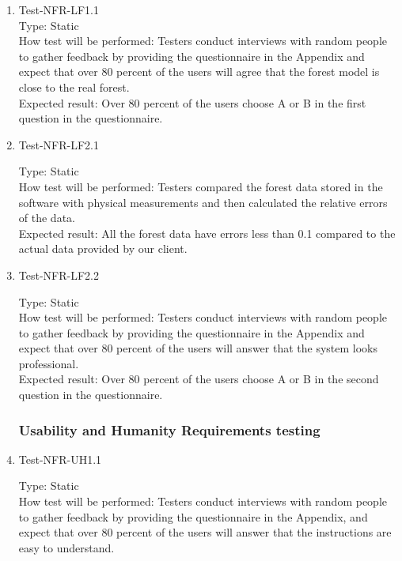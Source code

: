 \documentclass[12pt, titlepage]{article}
\begin{document}
\begin{enumerate}

\item{Test-NFR-LF1.1\\}
Type: Static\\

How test will be performed: Testers conduct interviews with random people to gather feedback by providing the questionnaire in the Appendix and expect that over 80 percent of the users will agree that the forest model is close to the real forest.\\

Expected result: Over 80 percent of the users choose A or B in the first question in the questionnaire.

\item{Test-NFR-LF2.1\\}

Type: Static\\

How test will be performed: Testers compared the forest data stored in the software with physical measurements and then calculated the relative errors of the data.\\

Expected result: All the forest data have errors less than 0.1 compared to the actual data provided by our client. 

\item{Test-NFR-LF2.2\\}

Type: Static\\

How test will be performed: Testers conduct interviews with random people to gather feedback by providing the questionnaire in the Appendix and expect that over 80 percent of the users will answer that the system looks professional.\\

Expected result: Over 80 percent of the users choose A or B in the second question in the questionnaire.

\subsubsection{Usability and Humanity Requirements testing}
\item{Test-NFR-UH1.1\\}

Type: Static\\

How test will be performed: Testers conduct interviews with random people to gather feedback by providing the questionnaire in the Appendix, and expect that over 80 percent of the users will answer that the instructions are easy to understand. \\


\end{enumerate}
\end{document}
